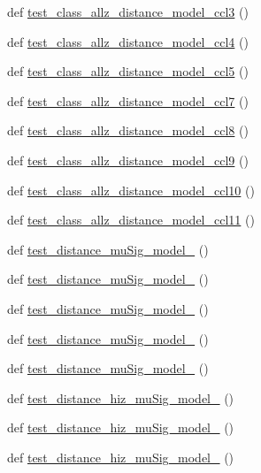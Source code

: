 \begin{DoxyCompactItemize}
def \mbox{\hyperlink{namespaceccl__test__distances_ae08d6a006a5dbe616062b627f6e9eb82}{test\+\_\+class\+\_\+allz\+\_\+distance\+\_\+model\+\_\+ccl3}} ()
\item 
def \mbox{\hyperlink{namespaceccl__test__distances_a8128c37e47742e3310cf02f4af3ed5a6}{test\+\_\+class\+\_\+allz\+\_\+distance\+\_\+model\+\_\+ccl4}} ()
\item 
def \mbox{\hyperlink{namespaceccl__test__distances_aee52cf26198eefd6f931a6eba0fd64f8}{test\+\_\+class\+\_\+allz\+\_\+distance\+\_\+model\+\_\+ccl5}} ()
\item 
def \mbox{\hyperlink{namespaceccl__test__distances_afd01c8b5942ca3a72ec88924c2bc2bde}{test\+\_\+class\+\_\+allz\+\_\+distance\+\_\+model\+\_\+ccl7}} ()
\item 
def \mbox{\hyperlink{namespaceccl__test__distances_a8a1ab66bfcbfd819505ede99df81804a}{test\+\_\+class\+\_\+allz\+\_\+distance\+\_\+model\+\_\+ccl8}} ()
\item 
def \mbox{\hyperlink{namespaceccl__test__distances_ab6014e7327e5c54cf2e19263dd500d6f}{test\+\_\+class\+\_\+allz\+\_\+distance\+\_\+model\+\_\+ccl9}} ()
\item 
def \mbox{\hyperlink{namespaceccl__test__distances_ace38ea7a9a01977c97b0bb82361395a2}{test\+\_\+class\+\_\+allz\+\_\+distance\+\_\+model\+\_\+ccl10}} ()
\item 
def \mbox{\hyperlink{namespaceccl__test__distances_a19ab73fee94087dd588c171a485aa0d2}{test\+\_\+class\+\_\+allz\+\_\+distance\+\_\+model\+\_\+ccl11}} ()
\item 
def \mbox{\hyperlink{namespaceccl__test__distances_a0770e482affe54199ba9702b0b91060d}{test\+\_\+distance\+\_\+mu\+Sig\+\_\+model\+\_}} ()
\item 
def \mbox{\hyperlink{namespaceccl__test__distances_aed8524e5231105c669320d7c027ca2cf}{test\+\_\+distance\+\_\+mu\+Sig\+\_\+model\+\_}} ()
\item 
def \mbox{\hyperlink{namespaceccl__test__distances_a72c390ee6b47267bf65d2d3f926fff90}{test\+\_\+distance\+\_\+mu\+Sig\+\_\+model\+\_}} ()
\item 
def \mbox{\hyperlink{namespaceccl__test__distances_ac52b3fd869f93df0c8fa3b31bb926605}{test\+\_\+distance\+\_\+mu\+Sig\+\_\+model\+\_}} ()
\item 
def \mbox{\hyperlink{namespaceccl__test__distances_afc66d9ac948d4f43c91531b29f3f30ac}{test\+\_\+distance\+\_\+mu\+Sig\+\_\+model\+\_}} ()
\item 
def \mbox{\hyperlink{namespaceccl__test__distances_a20708b45af6f175d675ed95b9bfa3652}{test\+\_\+distance\+\_\+hiz\+\_\+mu\+Sig\+\_\+model\+\_}} ()
\item 
def \mbox{\hyperlink{namespaceccl__test__distances_a2f8584e306d585e5265422c371f03c76}{test\+\_\+distance\+\_\+hiz\+\_\+mu\+Sig\+\_\+model\+\_}} ()
\item 
def \mbox{\hyperlink{namespaceccl__test__distances_a4ad745fe6db5666e48c651f25d58d58f}{test\+\_\+distance\+\_\+hiz\+\_\+mu\+Sig\+\_\+model\+\_}} ()
\end{DoxyCompactItemize}
